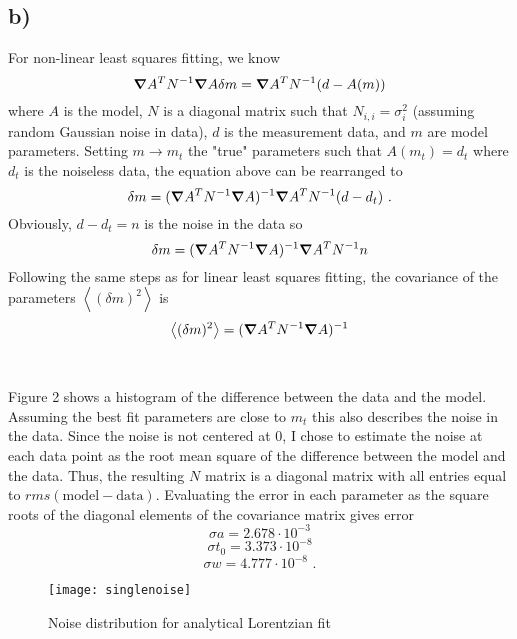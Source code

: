 \documentclass{article}
\newcommand{\<}[1]{\left\langle #1 \right\rangle }
\begin{document}
\subsection{b)}
For non-linear least squares fitting, we know
\[\grad A^T N^{-1}\grad A \delta m = \grad A^T N^{-1} (d - A(m))\]
where $A$ is the model, $N$ is a diagonal matrix such that $N_{i,i} = \sigma^2_i$ (assuming random Gaussian noise in data), $d$ is the measurement data, and $m$ are model parameters. Setting $m \to m_t$ the "true" parameters such that $A(m_t) = d_t$ where $d_t$ is the noiseless data, the equation above can be rearranged to 
\[\delta m = (\grad A^T N^{-1} \grad A)^{-1} \grad A^T N^{-1} (d-d_t) \text{ .}\]
Obviously, $d-d_t = n$ is the noise in the data so
\[\delta m = (\grad A^T N^{-1} \grad A)^{-1} \grad A^T N^{-1} n \]
Following the same steps as for linear least squares fitting, the covariance of the parameters $\<{(\delta m)^2}$ is 
\[\<{(\delta m)^2} = (\grad A^T N^{-1} \grad A)^{-1} \]\\
\\
Figure 2 shows a histogram of the difference between the data and the model. Assuming the best fit parameters are close to $m_t$ this also describes the noise in the data. Since the noise is not centered at 0, I chose to estimate the noise at each data point as the root mean square of the difference between the model and the data. Thus, the resulting $N$ matrix is a diagonal matrix with all entries equal to $rms(\text{model} - \text{data})$. Evaluating the error in each parameter as the square roots of the diagonal elements of the covariance matrix gives error
\[\sigma a = 2.678 \cdot 10^{-3}\]
\[\sigma t_0 = 3.373 \cdot 10^{-8}\]
\[\sigma w = 4.777 \cdot 10^{-8} \text{ .}\]
\begin{figure}[h]
	\caption{Noise distribution for analytical Lorentzian fit}
	\centering
	\texttt{[image: singlenoise]}
\end{figure}
\end{document}
